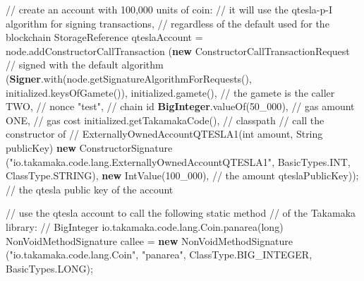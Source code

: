 \documentclass[a4paper,]{book}
\newenvironment{Shaded}{\begin{snugshade}}{\end{snugshade}}
\newcommand{\BuiltInTok}[1]{\textcolor[rgb]{0.39,0.29,0.61}{\textbf{#1}}}
\newcommand{\CommentTok}[1]{\textcolor[rgb]{0.54,0.53,0.53}{#1}}
\newcommand{\DecValTok}[1]{\textcolor[rgb]{0.69,0.50,0.00}{#1}}
\newcommand{\FunctionTok}[1]{\textcolor[rgb]{0.39,0.29,0.61}{#1}}
\newcommand{\KeywordTok}[1]{\textcolor[rgb]{0.12,0.11,0.11}{\textbf{#1}}}
\newcommand{\NormalTok}[1]{\textcolor[rgb]{0.12,0.11,0.11}{#1}}
\newcommand{\StringTok}[1]{\textcolor[rgb]{0.75,0.01,0.01}{#1}}
\renewenvironment{Shaded}{\begin{snugshade}\small}{\end{snugshade}}
\begin{document}
{\begin{Shaded}
\begin{Highlighting}[]
      \CommentTok{// create an account with 100,000 units of coin:}
      \CommentTok{// it will use the qtesla-p-I algorithm for signing transactions,}
      \CommentTok{// regardless of the default used for the blockchain}
\NormalTok{      StorageReference qteslaAccount = node.}\FunctionTok{addConstructorCallTransaction}
\NormalTok{       (}\KeywordTok{new}\NormalTok{ ConstructorCallTransactionRequest}
        \CommentTok{// signed with the default algorithm}
\NormalTok{        (}\BuiltInTok{Signer}\NormalTok{.}\FunctionTok{with}\NormalTok{(node.}\FunctionTok{getSignatureAlgorithmForRequests}\NormalTok{(),}
\NormalTok{            initialized.}\FunctionTok{keysOfGamete}\NormalTok{()),}
\NormalTok{         initialized.}\FunctionTok{gamete}\NormalTok{(), }\CommentTok{// the gamete is the caller}
\NormalTok{         TWO, }\CommentTok{// nonce}
         \StringTok{"test"}\NormalTok{, }\CommentTok{// chain id}
         \BuiltInTok{BigInteger}\NormalTok{.}\FunctionTok{valueOf}\NormalTok{(}\DecValTok{50_000}\NormalTok{), }\CommentTok{// gas amount}
\NormalTok{         ONE, }\CommentTok{// gas cost}
\NormalTok{         initialized.}\FunctionTok{getTakamakaCode}\NormalTok{(), }\CommentTok{// classpath}
         \CommentTok{// call the constructor of}
         \CommentTok{// ExternallyOwnedAccountQTESLA1(int amount, String publicKey)}
         \KeywordTok{new}\NormalTok{ ConstructorSignature}
\NormalTok{           (}\StringTok{"io.takamaka.code.lang.ExternallyOwnedAccountQTESLA1"}\NormalTok{,}
\NormalTok{            BasicTypes.}\FunctionTok{INT}\NormalTok{, ClassType.}\FunctionTok{STRING}\NormalTok{),}
         \KeywordTok{new} \FunctionTok{IntValue}\NormalTok{(}\DecValTok{100_000}\NormalTok{), }\CommentTok{// the amount}
\NormalTok{         qteslaPublicKey)); }\CommentTok{// the qtesla public key of the account}

      \CommentTok{// use the qtesla account to call the following static method}
      \CommentTok{// of the Takamaka library:}
      \CommentTok{// BigInteger io.takamaka.code.lang.Coin.panarea(long)}
\NormalTok{      NonVoidMethodSignature callee = }\KeywordTok{new}\NormalTok{ NonVoidMethodSignature}
\NormalTok{        (}\StringTok{"io.takamaka.code.lang.Coin"}\NormalTok{, }\StringTok{"panarea"}\NormalTok{,}
\NormalTok{         ClassType.}\FunctionTok{BIG_INTEGER}\NormalTok{, BasicTypes.}\FunctionTok{LONG}\NormalTok{);}


\end{Highlighting}
\end{Shaded}}
\end{document}
